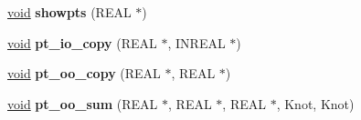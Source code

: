\begin{DoxyCompactItemize}
\mbox{\label{struct_knotspec_af6c541cc19c1cf60f3c2d0476e24ce3e}} 
\hyperlink{interfacevoid}{void} {\bfseries showpts} (R\+E\+AL $\ast$)
\item 
\mbox{\label{struct_knotspec_afa99725d569da93ff30da16eb19bf5eb}} 
\hyperlink{interfacevoid}{void} {\bfseries pt\+\_\+io\+\_\+copy} (R\+E\+AL $\ast$, I\+N\+R\+E\+AL $\ast$)
\item 
\mbox{\label{struct_knotspec_adcc7fc31d3b6d00a412db5c3e76b3b43}} 
\hyperlink{interfacevoid}{void} {\bfseries pt\+\_\+oo\+\_\+copy} (R\+E\+AL $\ast$, R\+E\+AL $\ast$)
\item 
\mbox{\label{struct_knotspec_ae375d5e3442a8c2ef45bf2abd190f426}} 
\hyperlink{interfacevoid}{void} {\bfseries pt\+\_\+oo\+\_\+sum} (R\+E\+AL $\ast$, R\+E\+AL $\ast$, R\+E\+AL $\ast$, Knot, Knot)
\end{DoxyCompactItemize}
